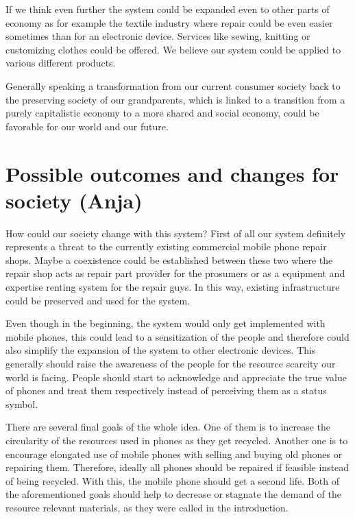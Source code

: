 \documentclass[11pt]{scrartcl}
\begin{document}
If we think even further the system could be expanded even to other parts of economy as for example the textile industry where repair could be even easier sometimes than for an electronic device. Services like sewing, knitting or customizing clothes could be offered. We believe our system could be applied to various different products.

Generally speaking a transformation from our current consumer society back to the preserving society of our grandparents, which is linked to a transition from a purely capitalistic economy to a more shared and social economy, could be favorable for our world and our future.

\section{Possible outcomes and changes for society (Anja)}

How could our society change with this system? First of all our system definitely represents a threat to the currently existing commercial mobile phone repair shops. Maybe a coexistence could be established between these two where the repair shop acts as repair part provider for the prosumers or as a equipment and expertise renting system for the repair guys. In this way, existing infrastructure could be preserved and used for the system.

Even though in the beginning, the system would only get implemented with mobile phones, this could lead to a sensitization of the people and therefore could also simplify the expansion of the system to other electronic devices. This generally should raise the awareness of the people for the resource scarcity our world is facing. People should start to acknowledge and appreciate the true value of phones and treat them respectively instead of perceiving them as a status symbol.

There are several final goals of the whole idea. One of them is to increase the circularity of the resources used in phones as they get recycled. Another one is to encourage elongated use of mobile phones with selling and buying old phones or repairing them. Therefore, ideally all phones should be repaired if feasible instead of being recycled. With this, the mobile phone should get a second life. Both of the aforementioned goals should help to decrease or stagnate the demand of the resource relevant materials, as they were called in the introduction.
\end{document}
